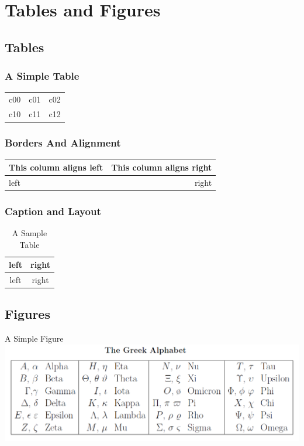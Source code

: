 \section{Tables and Figures}

\subsection{Tables}

\begin{frame}
\frametitle{A Simple Table}
\begin{tabular}{ rlc }
	c00 & c01 & c02 \\
	c10 & c11 & c12 \\
\end{tabular}
\end{frame}


\begin{frame}
\frametitle{Borders And Alignment}
\begin{tabular}{ l | r | }
  \hline			
  This column aligns left & This column aligns right \\
  \hline			
  left & right \\
  \hline			
\end{tabular}
\end{frame}


\begin{frame}
\frametitle{Caption and Layout}
\begin{table}
\centering
\begin{tabular}{ c|c }
    left & right \\
    \hline
    left & right \\
\end{tabular}
\caption{A Sample Table}
\end{table}
\end{frame}


\subsection{Figures}


\begin{frame}{A Simple Figure}
\includegraphics[width=\textwidth]{assets/greek.png}
\end{frame}


